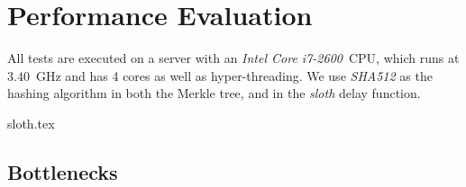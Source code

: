 \section{Performance Evaluation}

All tests are executed on a server with an \textit{Intel Core i7-2600}~CPU, which runs at $3.40$~GHz and has 4 cores as well as hyper-threading.
We use \textit{SHA512} as the hashing algorithm in both the Merkle tree, and in the \textit{sloth} delay function.

{sloth.tex}

\subsection{Bottlenecks}%
\label{sub:bottlenecks}

